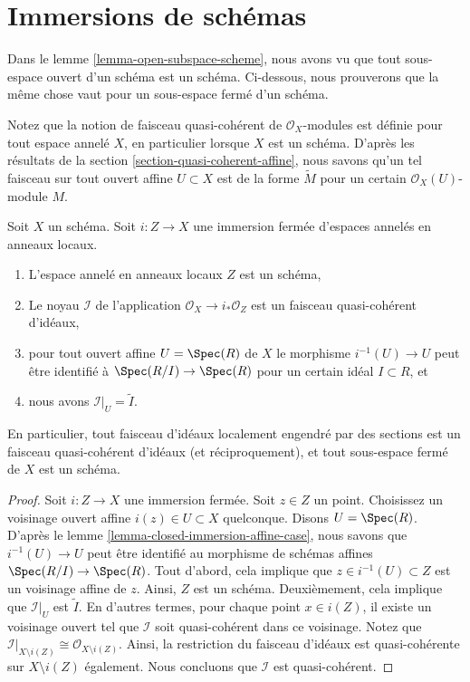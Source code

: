 \section{Immersions de schémas}
\label{section-immersions}

\noindent
Dans le lemme \ref{lemma-open-subspace-scheme}, nous avons vu que tout sous-espace ouvert
d'un schéma est un schéma. Ci-dessous, nous prouverons que la même chose vaut
pour un sous-espace fermé d'un schéma.

\medskip\noindent
Notez que la notion de faisceau quasi-cohérent de $\mathcal{O}_X$-modules est définie
pour tout espace annelé $X$, en particulier lorsque $X$ est un schéma. D'après
les résultats de la section \ref{section-quasi-coherent-affine}, nous
savons qu'un tel faisceau sur tout ouvert affine $U \subset X$ est
de la forme $\widetilde M$ pour un certain $\mathcal{O}_X(U)$-module $M$.

\begin{lemma}
\label{lemma-closed-subspace-scheme}
Soit $X$ un schéma. Soit $i : Z \to X$ une immersion fermée d'espaces
annelés en anneaux locaux.
\begin{enumerate}
\item L'espace annelé en anneaux locaux $Z$ est un
schéma, \item Le noyau $\mathcal{I}$ de l'application
$\mathcal{O}_X \to i_*\mathcal{O}_Z$ est un faisceau
quasi-cohérent
d'idéaux, \item pour tout ouvert affine $U = \Spec(R)$ de
$X$ le morphisme $i^{-1}(U) \to U$ peut être identifié à
$\Spec(R/I) \to \Spec(R)$ pour un certain idéal $I \subset R$, et
\item nous avons $\mathcal{I}|_U = \widetilde I$.
\end{enumerate}
En particulier, tout faisceau d'idéaux localement engendré par des sections
est un faisceau quasi-cohérent d'idéaux (et réciproquement),
et tout sous-espace fermé de $X$ est un schéma.
\end{lemma}

\begin{proof}
Soit $i : Z \to X$ une immersion fermée. Soit
$z \in Z$ un point. Choisissez un voisinage ouvert
affine $i(z) \in U \subset X$ quelconque. Disons $U =
\Spec(R)$. D'après le lemme \ref{lemma-closed-immersion-affine-case},
nous savons que $i^{-1}(U) \to U$ peut être identifié au
morphisme de schémas affines $\Spec(R/I) \to
\Spec(R)$. Tout d'abord, cela implique que $z \in i^{-1}(U) \subset Z$
est un voisinage affine de $z$. Ainsi, $Z$ est un schéma.
Deuxièmement, cela implique que $\mathcal{I}|_U$ est $\widetilde
I$. En d'autres termes, pour chaque point $x \in i(Z)$, il
existe un voisinage ouvert tel que $\mathcal{I}$ soit quasi-cohérent
dans ce voisinage. Notez que $\mathcal{I}|_{X \setminus i(Z)}
\cong \mathcal{O}_{X \setminus i(Z)}$. Ainsi, la restriction du
faisceau d'idéaux est quasi-cohérente sur $X \setminus i(Z)$
également. Nous concluons que $\mathcal{I}$ est quasi-cohérent.
\end{proof}

